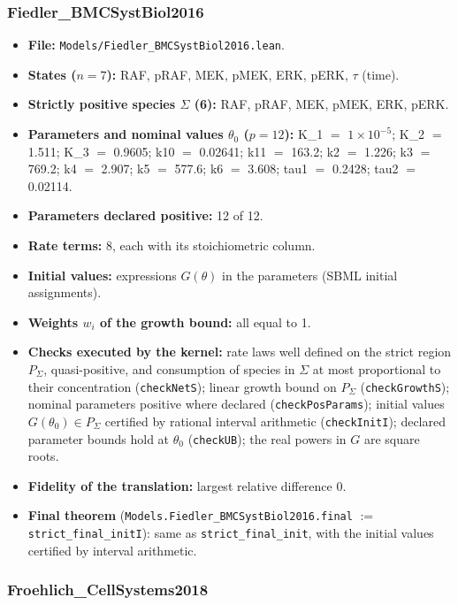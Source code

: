 \subsubsection*{Fiedler\_BMCSystBiol2016}

\begin{itemize}\itemsep0pt\small
\item \textbf{File:} \texttt{Models/Fiedler\_BMCSystBiol2016.lean}.
\item \textbf{States ($n=7$):} RAF, pRAF, MEK, pMEK, ERK, pERK, $\tau$ (time).
\item \textbf{Strictly positive species $\Sigma$ (6):} RAF, pRAF, MEK, pMEK, ERK, pERK.
\item \textbf{Parameters and nominal values $\theta_0$ ($p=12$):} K\_1 $=$ $1\times10^{-5}$; K\_2 $=$ 1.511; K\_3 $=$ 0.9605; k10 $=$ 0.02641; k11 $=$ 163.2; k2 $=$ 1.226; k3 $=$ 769.2; k4 $=$ 2.907; k5 $=$ 577.6; k6 $=$ 3.608; tau1 $=$ 0.2428; tau2 $=$ 0.02114.
\item \textbf{Parameters declared positive:} 12 of 12.
\item \textbf{Rate terms:} 8, each with its stoichiometric column.
\item \textbf{Initial values:} expressions $G(\theta)$ in the parameters (SBML initial assignments).
\item \textbf{Weights $w_i$ of the growth bound:} all equal to 1.
\item \textbf{Checks executed by the kernel:} rate laws well defined on the strict region $P_\Sigma$, quasi-positive, and consumption of species in $\Sigma$ at most proportional to their concentration (\texttt{checkNetS}); linear growth bound on $P_\Sigma$ (\texttt{checkGrowthS}); nominal parameters positive where declared (\texttt{checkPosParams}); initial values $G(\theta_0)\in P_\Sigma$ certified by rational interval arithmetic (\texttt{checkInitI}); declared parameter bounds hold at $\theta_0$ (\texttt{checkUB}); the real powers in $G$ are square roots.
\item \textbf{Fidelity of the translation:} largest relative difference 0.
\item \textbf{Final theorem} (\texttt{Models.Fiedler\_BMCSystBiol2016.final} $:=$ \texttt{strict\_final\_initI}): same as \texttt{strict\_final\_init}, with the initial values certified by interval arithmetic.
\end{itemize}

\subsubsection*{Froehlich\_CellSystems2018}

